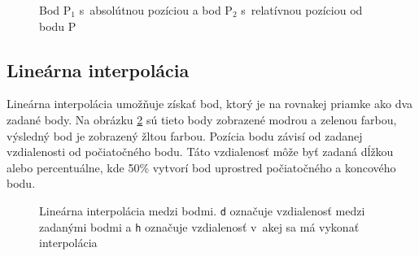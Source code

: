 \begin{figure}[H]
	\centering
	\caption{Bod P$_1$ s~absolútnou pozíciou a bod P$_2$ s~relatívnou pozíciou od bodu P}
	\label{fig:Point}
\end{figure}
\subsection*{Lineárna interpolácia}
Lineárna interpolácia umožňuje získať bod, ktorý je na rovnakej priamke ako dva zadané body. Na obrázku \ref{fig:PointLinearInterpolation} sú tieto body zobrazené modrou a zelenou farbou, výsledný bod je zobrazený žltou farbou. Pozícia bodu závisí od zadanej vzdia\-le\-nos\-ti od počiatočného bodu. Táto vzdia\-le\-nosť môže byť zadaná dĺžkou alebo percentuálne, kde 50\% vytvorí bod uprostred počiatočného a koncového bodu. 




\begin{figure}[H]
	\centering
	\caption{Lineárna interpolácia medzi bodmi.  \texttt{d} označuje vzdialenosť medzi zadanými bodmi a  \texttt{h} označuje vzdialenosť v~akej sa má vykonať interpolácia }
	\label{fig:PointLinearInterpolation}
\end{figure}

